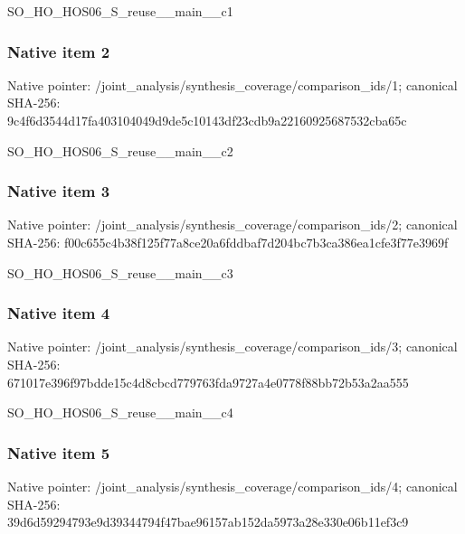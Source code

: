\documentclass[10pt,a4paper]{article}
\begin{document}
\begingroup\raggedright\sloppy SO\_\allowbreak{}HO\_\allowbreak{}HOS06\_\allowbreak{}S\_\allowbreak{}reuse\_\allowbreak{}\_\allowbreak{}main\_\allowbreak{}\_\allowbreak{}c1\par\endgroup

\subsubsection{Native item 2}
Native pointer: /joint\_\allowbreak{}analysis/synthesis\_\allowbreak{}coverage/comparison\_\allowbreak{}ids/1; canonical SHA-256: 9c4f6d3544d17fa403104049d9de5c10143df23cdb9a22160925687532cba65c

\begingroup\raggedright\sloppy SO\_\allowbreak{}HO\_\allowbreak{}HOS06\_\allowbreak{}S\_\allowbreak{}reuse\_\allowbreak{}\_\allowbreak{}main\_\allowbreak{}\_\allowbreak{}c2\par\endgroup

\subsubsection{Native item 3}
Native pointer: /joint\_\allowbreak{}analysis/synthesis\_\allowbreak{}coverage/comparison\_\allowbreak{}ids/2; canonical SHA-256: f00c655c4b38f125f77a8ce20a6fddbaf7d204bc7b3ca386ea1cfe3f77e3969f

\begingroup\raggedright\sloppy SO\_\allowbreak{}HO\_\allowbreak{}HOS06\_\allowbreak{}S\_\allowbreak{}reuse\_\allowbreak{}\_\allowbreak{}main\_\allowbreak{}\_\allowbreak{}c3\par\endgroup

\subsubsection{Native item 4}
Native pointer: /joint\_\allowbreak{}analysis/synthesis\_\allowbreak{}coverage/comparison\_\allowbreak{}ids/3; canonical SHA-256: 671017e396f97bdde15c4d8cbcd779763fda9727a4e0778f88bb72b53a2aa555

\begingroup\raggedright\sloppy SO\_\allowbreak{}HO\_\allowbreak{}HOS06\_\allowbreak{}S\_\allowbreak{}reuse\_\allowbreak{}\_\allowbreak{}main\_\allowbreak{}\_\allowbreak{}c4\par\endgroup

\subsubsection{Native item 5}
Native pointer: /joint\_\allowbreak{}analysis/synthesis\_\allowbreak{}coverage/comparison\_\allowbreak{}ids/4; canonical SHA-256: 39d6d59294793e9d39344794f47bae96157ab152da5973a28e330e06b11ef3c9
\end{document}
